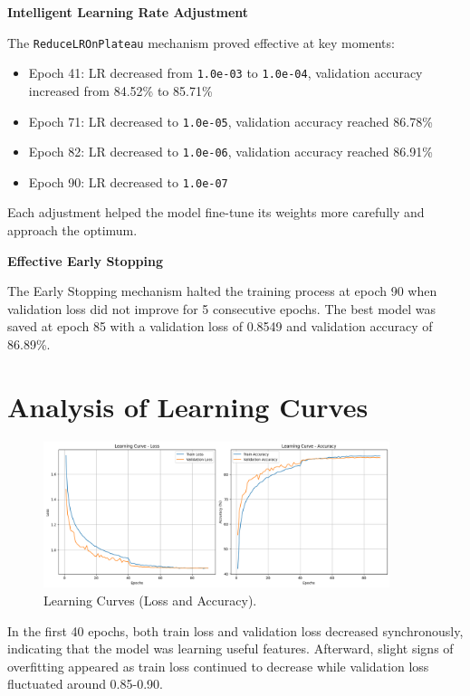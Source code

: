 \documentclass[12pt, a4paper, openany]{report}
\begin{document}
 \textbf{Intelligent Learning Rate Adjustment} %

 The \texttt{ReduceLROnPlateau} mechanism proved effective at key moments:
 \begin{itemize}
     \item Epoch 41: LR decreased from \texttt{1.0e-03} to \texttt{1.0e-04}, validation accuracy increased from 84.52\% to 85.71\% %
     \item Epoch 71: LR decreased to \texttt{1.0e-05}, validation accuracy reached 86.78\% %
     \item Epoch 82: LR decreased to \texttt{1.0e-06}, validation accuracy reached 86.91\% %
     \item Epoch 90: LR decreased to \texttt{1.0e-07} %
 \end{itemize}
 Each adjustment helped the model fine-tune its weights more carefully and approach the optimum.

 \textbf{Effective Early Stopping} %

 The Early Stopping mechanism halted the training process at epoch 90 when validation loss did not improve for 5 consecutive epochs. The best model was saved at epoch 85 with a validation loss of 0.8549 and validation accuracy of 86.89\%.

 \section{Analysis of Learning Curves} %
 \begin{figure}[H]
     \centering
     \includegraphics[width=0.9\textwidth]{learning_curves.png}
     \caption{Learning Curves (Loss and Accuracy).} %
     \label{fig:learning_curves}
 \end{figure}
 In the first 40 epochs, both train loss and validation loss decreased synchronously, indicating that the model was learning useful features. Afterward, slight signs of overfitting appeared as train loss continued to decrease while validation loss fluctuated around 0.85-0.90.
\end{document}
